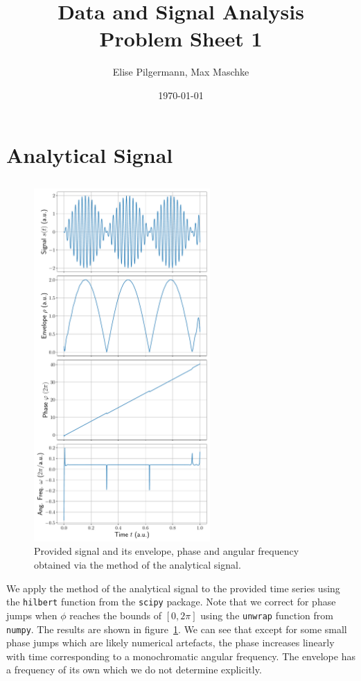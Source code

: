 \documentclass[a4paper,DIV=12,english]{scrartcl}
\title{Data and Signal Analysis\\Problem Sheet 1}
\author{Elise Pilgermann, Max Maschke}
\date{\today}
\begin{document}
\maketitle
\section{Analytical Signal}
\subsection{}
\begin{figure}
    \centering
    \includegraphics[width=0.6\textwidth]{../analytic_sig.pdf}
    \caption{Provided signal and its envelope, phase and angular frequency obtained via the method of the analytical signal.}
    \label{fig:ts}
\end{figure}
We apply the method of the analytical signal to the provided time series using the \texttt{hilbert} function from the \texttt{scipy} package. Note that we correct for phase jumps when $\phi$ reaches the bounds of $[0, 2\pi]$ using the \texttt{unwrap} function from \texttt{numpy}. The results are shown in figure~\ref{fig:ts}. We can see that except for some small phase jumps which are likely numerical artefacts, the phase increases linearly with time corresponding to a monochromatic angular frequency. The envelope has a frequency of its own which we do not determine explicitly.
\end{document}
